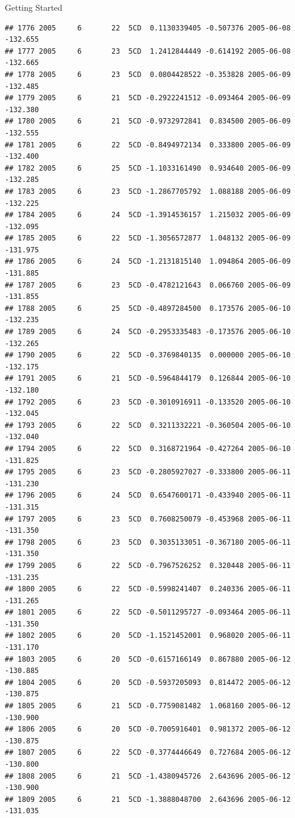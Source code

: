 \documentclass[
  ignorenonframetext,
]{beamer}
\begin{document}
\begin{frame}[fragile]{Getting Started}
\begin{verbatim}
## 1776 2005     6       22  5CD  0.1130339405 -0.507376 2005-06-08 -132.655
## 1777 2005     6       23  5CD  1.2412844449 -0.614192 2005-06-08 -132.665
## 1778 2005     6       23  5CD  0.0804428522 -0.353828 2005-06-09 -132.485
## 1779 2005     6       21  5CD -0.2922241512 -0.093464 2005-06-09 -132.380
## 1780 2005     6       21  5CD -0.9732972841  0.834500 2005-06-09 -132.555
## 1781 2005     6       22  5CD -0.8494972134  0.333800 2005-06-09 -132.400
## 1782 2005     6       25  5CD -1.1033161490  0.934640 2005-06-09 -132.285
## 1783 2005     6       23  5CD -1.2867705792  1.088188 2005-06-09 -132.225
## 1784 2005     6       24  5CD -1.3914536157  1.215032 2005-06-09 -132.095
## 1785 2005     6       22  5CD -1.3056572877  1.048132 2005-06-09 -131.975
## 1786 2005     6       24  5CD -1.2131815140  1.094864 2005-06-09 -131.885
## 1787 2005     6       23  5CD -0.4782121643  0.066760 2005-06-09 -131.855
## 1788 2005     6       25  5CD -0.4897284500  0.173576 2005-06-10 -132.235
## 1789 2005     6       24  5CD -0.2953335483 -0.173576 2005-06-10 -132.265
## 1790 2005     6       22  5CD -0.3769840135  0.000000 2005-06-10 -132.175
## 1791 2005     6       21  5CD -0.5964844179  0.126844 2005-06-10 -132.180
## 1792 2005     6       23  5CD -0.3010916911 -0.133520 2005-06-10 -132.045
## 1793 2005     6       22  5CD  0.3211332221 -0.360504 2005-06-10 -132.040
## 1794 2005     6       22  5CD  0.3168721964 -0.427264 2005-06-10 -131.825
## 1795 2005     6       23  5CD -0.2805927027 -0.333800 2005-06-11 -131.230
## 1796 2005     6       24  5CD  0.6547600171 -0.433940 2005-06-11 -131.315
## 1797 2005     6       23  5CD  0.7608250079 -0.453968 2005-06-11 -131.350
## 1798 2005     6       23  5CD  0.3035133051 -0.367180 2005-06-11 -131.350
## 1799 2005     6       22  5CD -0.7967526252  0.320448 2005-06-11 -131.235
## 1800 2005     6       22  5CD -0.5998241407  0.240336 2005-06-11 -131.265
## 1801 2005     6       22  5CD -0.5011295727 -0.093464 2005-06-11 -131.350
## 1802 2005     6       20  5CD -1.1521452001  0.968020 2005-06-11 -131.170
## 1803 2005     6       20  5CD -0.6157166149  0.867880 2005-06-12 -130.885
## 1804 2005     6       20  5CD -0.5937205093  0.814472 2005-06-12 -130.875
## 1805 2005     6       21  5CD -0.7759081482  1.068160 2005-06-12 -130.900
## 1806 2005     6       20  5CD -0.7005916401  0.981372 2005-06-12 -130.875
## 1807 2005     6       22  5CD -0.3774446649  0.727684 2005-06-12 -130.800
## 1808 2005     6       21  5CD -1.4380945726  2.643696 2005-06-12 -130.900
## 1809 2005     6       21  5CD -1.3888048700  2.643696 2005-06-12 -131.035

\end{verbatim}
\end{frame}
\end{document}

